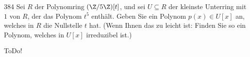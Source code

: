 \begin{algebraUE}{384}
Sei $R$ der Polynomring $(\Z/5\Z)[t]$, und sei $U \subseteq R$ der kleinste
Unterring mit $1$ von $R$, der das Polynom $t^5$ enthält. Geben Sie ein Polynom
$p(x) \in U[x]$ an, welches in $R$ die Nullstelle $t$ hat. (Wenn Ihnen das zu
leicht ist: Finden Sie so ein Polynom, welches in $U[x]$ irreduzibel ist.) 
\end{algebraUE}

\begin{solution}

ToDo!

\end{solution}
